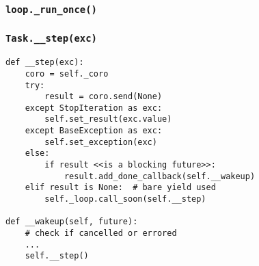 \documentclass[compress,usenames,dvipsnames]{beamer}
\begin{document}
\begin{frame}[plain]
    \frametitle{\lstinline{loop._run_once()}}
    \begin{algorithm}[H]
        \SetAlgoNoEnd
        \DontPrintSemicolon
    \end{algorithm}
\end{frame}

\begin{frame}
    \frametitle{\lstinline{Task.__step(exc)}}
    \scriptsize
    \begin{lstlisting}
def __step(exc):
    coro = self._coro
    try:
        result = coro.send(None)
    except StopIteration as exc:
        self.set_result(exc.value)
    except BaseException as exc:
        self.set_exception(exc)
    else:
        if result <<is a blocking future>>:
            result.add_done_callback(self.__wakeup)
    elif result is None:  # bare yield used
        self._loop.call_soon(self.__step)

def __wakeup(self, future):
    # check if cancelled or errored
    ...
    self.__step()
    \end{lstlisting}
\end{frame}
\end{document}
